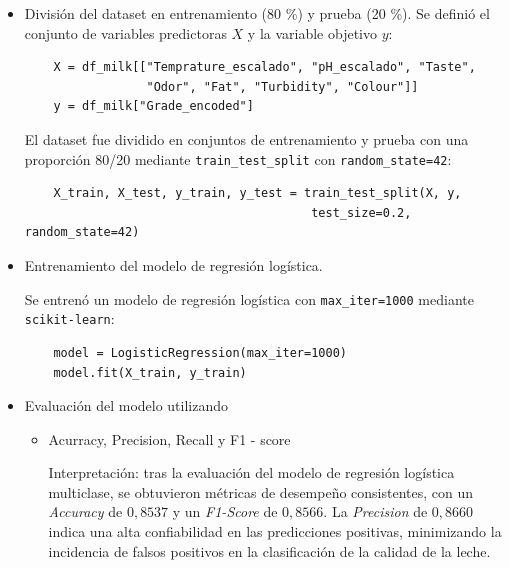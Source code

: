 \documentclass[12pt,a4paper]{article}
\begin{document}
\begin{itemize}
	\item[$\scalebox{0.7}{$\blacksquare$}$] División del dataset en entrenamiento (80 \%) y prueba (20 \%).
	Se definió el conjunto de variables predictoras $X$ y la variable objetivo $y$:

	\begin{verbatim}
	X = df_milk[["Temprature_escalado", "pH_escalado", "Taste", 
	             "Odor", "Fat", "Turbidity", "Colour"]]
	y = df_milk["Grade_encoded"]
	\end{verbatim}
	
	El dataset fue dividido en conjuntos de entrenamiento y prueba con una proporción
	80/20 mediante \texttt{train\_test\_split} con \texttt{random\_state=42}:
	
	\begin{verbatim}
	X_train, X_test, y_train, y_test = train_test_split(X, y, 
	                                    test_size=0.2, random_state=42)
	\end{verbatim}

	\item[$\scalebox{0.7}{$\blacksquare$}$] Entrenamiento del modelo de regresión logística.

	Se entrenó un modelo de regresión logística con \texttt{max\_iter=1000}
	mediante \texttt{scikit-learn}:
	
	\begin{verbatim}
	model = LogisticRegression(max_iter=1000)
	model.fit(X_train, y_train)
	\end{verbatim}

	\item[$\scalebox{0.7}{$\blacksquare$}$] Evaluación del modelo utilizando
					\begin{itemize}
					
							\item[$\scalebox{0.3}{$\blacksquare$}$] Acurracy, Precision, Recall y F1 - score
									\begin{center}
									    
									    \label{tab:metricas}
									\end{center}
									Interpretación: tras la evaluación del modelo de regresión logística multiclase, se obtuvieron métricas de desempeño consistentes, con un \textit{Accuracy} de $0,8537$ y un \textit{F1-Score} de $0,8566$. La \textit{Precision} de $0,8660$ indica una alta confiabilidad en las predicciones positivas, minimizando la incidencia de falsos positivos en la clasificación de la calidad de la leche. 
									

\end{itemize}
\end{itemize}
\end{document}
